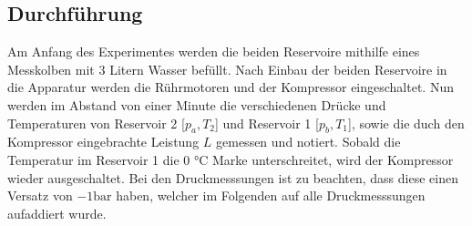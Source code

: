 \subsection{Durchführung}
Am Anfang des Experimentes werden die beiden Reservoire mithilfe eines Messkolben mit 3 Litern Wasser befüllt. Nach Einbau der beiden Reservoire
in die Apparatur werden die Rührmotoren und der Kompressor eingeschaltet. Nun werden im Abstand von einer Minute die verschiedenen Drücke und Temperaturen
von Reservoir 2 [$p_a, T_2$] und Reservoir 1 [$p_b, T_1$], sowie die duch den Kompressor eingebrachte Leistung $L$ gemessen und notiert.
Sobald die Temperatur im Reservoir 1 die 0 °C Marke unterschreitet, wird der Kompressor wieder ausgeschaltet.
Bei den Druckmesssungen ist zu beachten, dass diese einen Versatz von $-1 \si{\bar}$ haben, welcher im Folgenden auf alle Druckmesssungen aufaddiert wurde.
